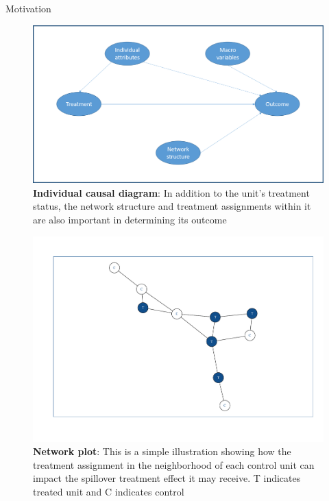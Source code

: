\documentclass[final]{beamer}
\newlength{\onecolwid}
\newlength{\onecolwidd}
\begin{document}
\begin{frame}[t]
\begin{columns}[t]
\begin{column}{\onecolwidd}
\begin{block}{Motivation}
	
\centering
\begin{figure}
\centering
\caption{\small \textbf{Individual causal diagram}: In addition to the unit's treatment status, the network structure and treatment assignments within it are also important in determining its outcome}
\includegraphics[scale=0.8]{Individual_structure.png}
\end{figure}
	
\centering
\begin{figure}
\centering
\caption{\small \textbf{Network plot}: This is a simple illustration showing how the treatment assignment in the neighborhood of each control unit can impact the spillover treatment effect it may receive. T indicates treated unit and C indicates control}
\includegraphics[scale=0.9]{Dummy_network.pdf}
\end{figure}	
	
	
	
	\end{block}
	


\end{column}
\end{columns}
\end{frame}
\end{document}
